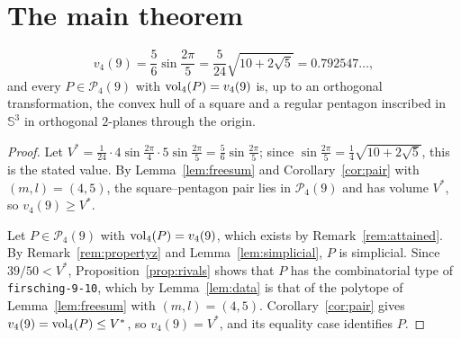 \section{The main theorem}
\label{sec:main}

\begin{theorem}
  \label{thm:main}
  \[
    v_{4}(9) = \frac{5}{6}\sin\frac{2\pi}{5}
      = \frac{5}{24}\sqrt{10 + 2\sqrt{5}} = 0.792547\ldots,
  \]
  and every $P \in \mathcal{P}_{4}(9)$ with $\operatorname{vol}_{4}(P) = v_{4}(9)$ is, up to
  an orthogonal transformation, the convex hull of a square and a regular
  pentagon inscribed in $\mathbb{S}^{3}$ in orthogonal $2$-planes through the
  origin.
\end{theorem}

\begin{proof}
  Let $V^{*} = \frac{1}{24}\cdot 4\sin\frac{2\pi}{4}\cdot 5\sin\frac{2\pi}{5} =
  \frac{5}{6}\sin\frac{2\pi}{5}$; since $\sin\frac{2\pi}{5} =
  \frac14\sqrt{10 + 2\sqrt5}$, this is the stated value. By
  Lemma~\ref{lem:freesum} and Corollary~\ref{cor:pair} with $(m, l) = (4, 5)$,
  the square--pentagon pair lies in $\mathcal{P}_{4}(9)$ and has volume
  $V^{*}$, so $v_{4}(9) \geq V^{*}$.

  Let $P \in \mathcal{P}_{4}(9)$ with $\operatorname{vol}_{4}(P) = v_{4}(9)$, which exists by
  Remark~\ref{rem:attained}. By Remark~\ref{rem:propertyz} and
  Lemma~\ref{lem:simplicial}, $P$ is simplicial. Since $39/50 < V^{*}$,
  Proposition~\ref{prop:rivals} shows that $P$ has the combinatorial type of
  \texttt{firsching-9-10}, which by Lemma~\ref{lem:data} is that of the
  polytope of Lemma~\ref{lem:freesum} with $(m, l) = (4, 5)$. Corollary~\ref{cor:pair} gives
  $v_{4}(9) = \operatorname{vol}_{4}(P) \leq V^{*}$, so $v_{4}(9) = V^{*}$, and its equality
  case identifies $P$.
\end{proof}
